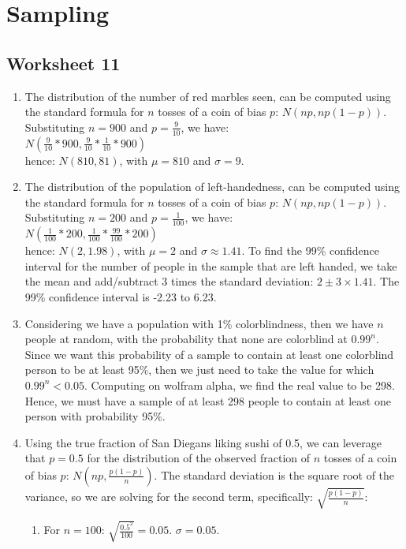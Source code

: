 \documentclass[12pt]{article}
\theoremstyle{plain}
\theoremstyle{definition}
\numberwithin{equation}{theorem}
\begin{document}
\section{Sampling}
\subsection{Worksheet 11}
\begin{enumerate}
\item The distribution of the number of red marbles seen, can be computed using the standard formula for $n$ tosses of a coin of bias $p$: $N(np,np(1-p))$. Substituting $n=900$ and $p=\frac{9}{10}$, we have:\\
\smallskip
$N(\frac{9}{10}*900,\frac{9}{10}*\frac{1}{10}*900)$\\
\smallskip
hence: $N(810,81)$, with $\mu = 810$ and $\sigma = 9$.
\item The distribution of the population of left-handedness, can be computed using the standard formula for $n$ tosses of a coin of bias $p$: $N(np,np(1-p))$. Substituting $n=200$ and $p=\frac{1}{100}$, we have:\\
\smallskip
$N(\frac{1}{100}*200,\frac{1}{100}*\frac{99}{100}*200)$\\
\smallskip
hence: $N(2,1.98)$, with $\mu = 2$ and $\sigma \approx 1.41$. To find the 99\% confidence interval for the number of people in the sample that are left handed, we take the mean and add/subtract 3 times the standard deviation: $2 \pm 3 \times 1.41$. The 99\% confidence interval is -2.23 to 6.23.
\addtocounter{enumi}{1}
\item Considering we have a population with 1\% colorblindness, then we have $n$ people at random, with the probability that none are colorblind at $0.99^{n}$. Since we want this probability of a sample to contain at least one colorblind person to be at least 95\%, then we just need to take the value for which $0.99^{n} < 0.05$. Computing on wolfram alpha, we find the real value to be 298. Hence, we must have a sample of at least 298 people to contain at least one person with probability 95\%.
\item Using the true fraction of San Diegans liking sushi of 0.5, we can leverage that $p=0.5$ for the distribution of the observed fraction of $n$ tosses of a coin of bias $p$: $N(np,\frac{p(1-p)}{n})$. The standard deviation is the square root of the variance, so we are solving for the second term, specifically: $\sqrt{\frac{p(1-p)}{n}}$:
	\begin{enumerate}
	\item For $n = 100$: $\sqrt{\frac{0.5^{2}}{100}} = 0.05$. $\sigma = 0.05$.

\end{enumerate}
\end{enumerate}
\end{document}
